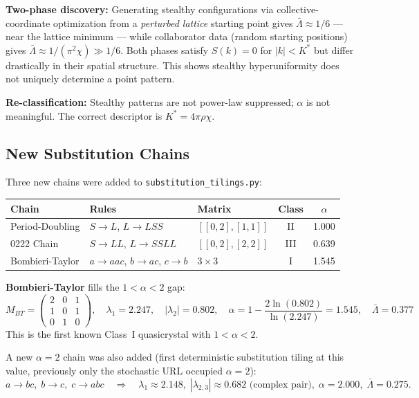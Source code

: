 \documentclass[11pt,letterpaper]{article}
\begin{document}
\textbf{Two-phase discovery:} Generating stealthy configurations via collective-coordinate
optimization from a \emph{perturbed lattice} starting point gives $\bar\Lambda \approx 1/6$
--- near the lattice minimum --- while collaborator data (random starting positions) gives
$\bar\Lambda \approx 1/(\pi^2\chi) \gg 1/6$. Both phases satisfy $S(k)=0$ for $|k|<K^*$
but differ drastically in their spatial structure. This shows stealthy hyperuniformity does
not uniquely determine a point pattern.

\textbf{Re-classification:} Stealthy patterns are not power-law suppressed; $\alpha$ is not
meaningful. The correct descriptor is $K^* = 4\pi\rho\chi$.

\subsection{New Substitution Chains}

Three new chains were added to \texttt{substitution\_tilings.py}:

\noindent\begin{tabular}{lllcc}
\toprule
\textbf{Chain} & \textbf{Rules} & \textbf{Matrix} & \textbf{Class} & $\alpha$ \\
\midrule
Period-Doubling & $S \to L$, $L \to LSS$    & $[[0,2],[1,1]]$    & II  & 1.000 \\
0222 Chain      & $S \to LL$, $L \to SSLL$  & $[[0,2],[2,2]]$    & III & 0.639 \\
Bombieri-Taylor & $a \to aac$, $b \to ac$, $c \to b$ & $3\times3$ & I   & 1.545 \\
\bottomrule
\end{tabular}

\textbf{Bombieri-Taylor} fills the $1 < \alpha < 2$ gap:
\[
  M_{BT} = \begin{pmatrix}2&0&1\\1&0&1\\0&1&0\end{pmatrix},\quad
  \lambda_1 = 2.247,\quad |\lambda_2| = 0.802,\quad
  \alpha = 1 - \frac{2\ln(0.802)}{\ln(2.247)} = \mathbf{1.545}, \quad
  \bar\Lambda = 0.377
\]
This is the first known Class~I quasicrystal with $1 < \alpha < 2$.

A new $\alpha=2$ chain was also added (first deterministic substitution tiling at this value,
previously only the stochastic URL occupied $\alpha=2$):
\[
  a \to bc,\; b \to c,\; c \to abc \quad
  \Rightarrow \quad \lambda_1 \approx 2.148,\; |\lambda_{2,3}| \approx 0.682\text{ (complex pair)},\;
  \alpha = 2.000,\; \bar\Lambda = 0.275.
\]
\end{document}
